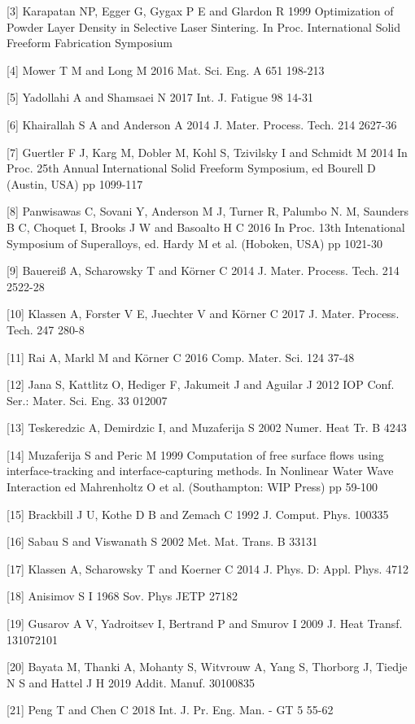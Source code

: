 \documentclass[10pt]{article}
\begin{document}
[3] Karapatan NP, Egger G, Gygax P E and Glardon R 1999 Optimization of Powder Layer Density in Selective Laser Sintering. In Proc. International Solid Freeform Fabrication Symposium

[4] Mower T M and Long M 2016 Mat. Sci. Eng. A 651 198-213

[5] Yadollahi A and Shamsaei N 2017 Int. J. Fatigue 98 14-31

[6] Khairallah S A and Anderson A 2014 J. Mater. Process. Tech. 214 2627-36

[7] Guertler F J, Karg M, Dobler M, Kohl S, Tzivilsky I and Schmidt M 2014 In Proc. 25th Annual International Solid Freeform Symposium, ed Bourell D (Austin, USA) pp 1099-117

[8] Panwisawas C, Sovani Y, Anderson M J, Turner R, Palumbo N. M, Saunders B C, Choquet I, Brooks J W and Basoalto H C 2016 In Proc. 13th Intenational Symposium of Superalloys, ed. Hardy M et al. (Hoboken, USA) pp 1021-30

[9] Bauereiß A, Scharowsky T and Körner C 2014 J. Mater. Process. Tech. 214 2522-28

[10] Klassen A, Forster V E, Juechter V and Körner C 2017 J. Mater. Process. Tech. 247 280-8

[11] Rai A, Markl M and Körner C 2016 Comp. Mater. Sci. 124 37-48

[12] Jana S, Kattlitz O, Hediger F, Jakumeit J and Aguilar J 2012 IOP Conf. Ser.: Mater. Sci. Eng. 33 012007

[13] Teskeredzic A, Demirdzic I, and Muzaferija S 2002 Numer. Heat Tr. B 4243

[14] Muzaferija S and Peric M 1999 Computation of free surface flows using interface-tracking and interface-capturing methods. In Nonlinear Water Wave Interaction ed Mahrenholtz O et al. (Southampton: WIP Press) pp 59-100

[15] Brackbill J U, Kothe D B and Zemach C 1992 J. Comput. Phys. 100335

[16] Sabau S and Viswanath S 2002 Met. Mat. Trans. B 33131

[17] Klassen A, Scharowsky T and Koerner C 2014 J. Phys. D: Appl. Phys. 4712

[18] Anisimov S I 1968 Sov. Phys JETP 27182

[19] Gusarov A V, Yadroitsev I, Bertrand P and Smurov I 2009 J. Heat Transf. 131072101

[20] Bayata M, Thanki A, Mohanty S, Witvrouw A, Yang S, Thorborg J, Tiedje N S and Hattel J H 2019 Addit. Manuf. 30100835

[21] Peng T and Chen C 2018 Int. J. Pr. Eng. Man. - GT 5 55-62
\end{document}
